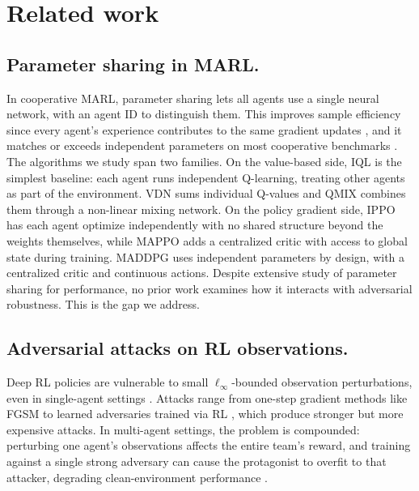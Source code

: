\documentclass{article}
\begin{document}
\section{Related work}
\subsection{Parameter sharing in MARL.}
In cooperative MARL, parameter sharing lets all agents use a single neural network, with an agent ID to distinguish them. This improves sample efficiency since every agent's experience contributes to the same gradient updates \citep{gupta2017cooperative}, and it matches or exceeds independent parameters on most cooperative benchmarks \citep{yu2022mappo}. The algorithms we study span two families. On the value-based side, IQL \citep{tan1993iql} is the simplest baseline: each agent runs independent Q-learning, treating other agents as part of the environment. VDN \citep{sunehag2018vdn} sums individual Q-values and QMIX \citep{rashid2020qmix} combines them through a non-linear mixing network. On the policy gradient side, IPPO \citep{dewitt2020ippo} has each agent optimize independently with no shared structure beyond the weights themselves, while MAPPO \citep{yu2022mappo} adds a centralized critic with access to global state during training. MADDPG \citep{lowe2017maddpg} uses independent parameters by design, with a centralized critic and continuous actions. Despite extensive study of parameter sharing for performance, no prior work examines how it interacts with adversarial robustness. This is the gap we address.

\subsection{Adversarial attacks on RL observations.}
Deep RL policies are vulnerable to small $\ell_\infty$-bounded observation perturbations, even in single-agent settings \citep{zhang2021robust}. Attacks range from one-step gradient methods like FGSM \citep{goodfellow2014explaining} to learned adversaries trained via RL \citep{zhang2021atla}, which produce stronger but more expensive attacks. In multi-agent settings, the problem is compounded: perturbing one agent's observations affects the entire team's reward, and training against a single strong adversary can cause the protagonist to overfit to that attacker, degrading clean-environment performance \citep{guo2024multiagent}.
\end{document}
